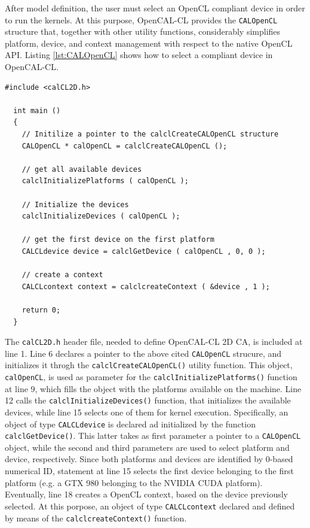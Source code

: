 After model definition, the user must select an OpenCL compliant
device in order to run the kernels. At this purpose, OpenCAL-CL
provides the \verb'CALOpenCL' structure that, together with other
utility functions, considerably simplifies platform, device, and
context management with respect to the native OpenCL API. Listing
\ref{lst:CALOpenCL} shows how to select a compliant device in
OpenCAL-CL.

\begin{lstlisting}[float,floatplacement=H, label=lst:CALOpenCL, caption=Access to platform and devices.]
  #include <calCL2D.h>

  int main ()
  {
    // Initilize a pointer to the calclCreateCALOpenCL structure
    CALOpenCL * calOpenCL = calclCreateCALOpenCL ();

    // get all available devices
    calclInitializePlatforms ( calOpenCL );

    // Initialize the devices
    calclInitializeDevices ( calOpenCL );

    // get the first device on the first platform
    CALCLdevice device = calclGetDevice ( calOpenCL , 0, 0 );

    // create a context
    CALCLcontext context = calclcreateContext ( &device , 1 );

    return 0;
  }
\end{lstlisting}


The \verb'calCL2D.h' header file, needed to define OpenCAL-CL 2D CA,
is included at line 1. Line 6 declares a pointer to the above cited
\verb'CALOpenCL' strucure, and initializes it throgh the
\verb'calclCreateCALOpenCL()' utility function. This object,
\verb'calOpenCL', is used as parameter for the
\verb'calclInitializePlatforms()' function at line 9, which fills the
object with the platforms available on the machine. Line 12 calls the
\verb'calclInitializeDevices()' function, that initializes the
available devices, while line 15 selects one of them for kernel
execution. Specifically, an object of type \verb'CALCLdevice' is
declared ad initialized by the function \verb'calclGetDevice()'. This
latter takes as first parameter a pointer to a \verb'CALOpenCL'
object, while the second and third parameters are used to select
platform and device, respectively. Since both platforms and devices
are identified by 0-based numerical ID, statement at line 15 selects
the first device belonging to the first platform (e.g. a GTX 980
belonging to the NVIDIA CUDA platform). Eventually, line 18 creates a
OpenCL context, based on the device previously selected. At this
porpose, an object of type \verb'CALCLcontext' declared and defined by
means of the \verb'calclcreateContext()' function.

